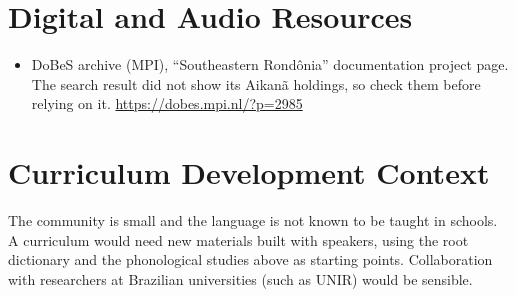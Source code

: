 \documentclass[12pt]{article}
\begin{document}
\section{Digital and Audio Resources}
\begin{itemize}
\item DoBeS archive (MPI), ``Southeastern Rond\^onia'' documentation project page. The search result did not show its Aikan\~a holdings, so check them before relying on it. \url{https://dobes.mpi.nl/?p=2985}
\end{itemize}

\section{Curriculum Development Context}
The community is small and the language is not known to be taught in schools. A curriculum would need new materials built with speakers, using the root dictionary and the phonological studies above as starting points. Collaboration with researchers at Brazilian universities (such as UNIR) would be sensible.
\end{document}
